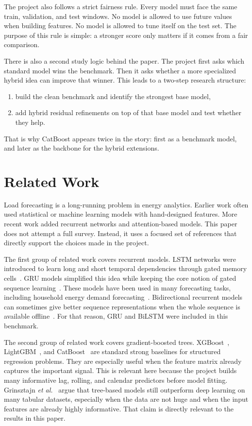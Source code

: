 \documentclass[conference]{IEEEtran}
\begin{document}
The project also follows a strict fairness rule. Every model must face the same train, validation, and test windows. No model is allowed to use future values when building features. No model is allowed to tune itself on the test set. The purpose of this rule is simple: a stronger score only matters if it comes from a fair comparison.

There is also a second study logic behind the paper. The project first asks which standard model wins the benchmark. Then it asks whether a more specialized hybrid idea can improve that winner. This leads to a two-step research structure:
\begin{enumerate}
\item build the clean benchmark and identify the strongest base model,
\item add hybrid residual refinements on top of that base model and test whether they help.
\end{enumerate}

That is why CatBoost appears twice in the story: first as a benchmark model, and later as the backbone for the hybrid extensions.

\section{Related Work}
Load forecasting is a long-running problem in energy analytics. Earlier work often used statistical or machine learning models with hand-designed features. More recent work added recurrent networks and attention-based models. This paper does not attempt a full survey. Instead, it uses a focused set of references that directly support the choices made in the project.

The first group of related work covers recurrent models. LSTM networks were introduced to learn long and short temporal dependencies through gated memory cells~\cite{hochreiter1997lstm}. GRU models simplified this idea while keeping the core notion of gated sequence learning~\cite{cho2014gru}. These models have been used in many forecasting tasks, including household energy demand forecasting~\cite{shi2018deep}. Bidirectional recurrent models can sometimes give better sequence representations when the whole sequence is available offline~\cite{schuster1997bilstm}. For that reason, GRU and BiLSTM were included in this benchmark.

The second group of related work covers gradient-boosted trees. XGBoost~\cite{chen2016xgboost}, LightGBM~\cite{ke2017lightgbm}, and CatBoost~\cite{dorogush2018catboost} are standard strong baselines for structured regression problems. They are especially useful when the feature matrix already captures the important signal. This is relevant here because the project builds many informative lag, rolling, and calendar predictors before model fitting. Grinsztajn \emph{et al.}~\cite{grinsztajn2022tree} argue that tree-based models still outperform deep learning on many tabular datasets, especially when the data are not huge and when the input features are already highly informative. That claim is directly relevant to the results in this paper.
\end{document}
